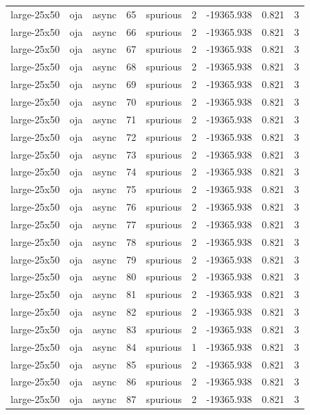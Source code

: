 \begin{tabular}{lllrlrrrr}
large-25x50 & oja & async & 65 & spurious & 2 & -19365.938 & 0.821 & 3 \\
large-25x50 & oja & async & 66 & spurious & 2 & -19365.938 & 0.821 & 3 \\
large-25x50 & oja & async & 67 & spurious & 2 & -19365.938 & 0.821 & 3 \\
large-25x50 & oja & async & 68 & spurious & 2 & -19365.938 & 0.821 & 3 \\
large-25x50 & oja & async & 69 & spurious & 2 & -19365.938 & 0.821 & 3 \\
large-25x50 & oja & async & 70 & spurious & 2 & -19365.938 & 0.821 & 3 \\
large-25x50 & oja & async & 71 & spurious & 2 & -19365.938 & 0.821 & 3 \\
large-25x50 & oja & async & 72 & spurious & 2 & -19365.938 & 0.821 & 3 \\
large-25x50 & oja & async & 73 & spurious & 2 & -19365.938 & 0.821 & 3 \\
large-25x50 & oja & async & 74 & spurious & 2 & -19365.938 & 0.821 & 3 \\
large-25x50 & oja & async & 75 & spurious & 2 & -19365.938 & 0.821 & 3 \\
large-25x50 & oja & async & 76 & spurious & 2 & -19365.938 & 0.821 & 3 \\
large-25x50 & oja & async & 77 & spurious & 2 & -19365.938 & 0.821 & 3 \\
large-25x50 & oja & async & 78 & spurious & 2 & -19365.938 & 0.821 & 3 \\
large-25x50 & oja & async & 79 & spurious & 2 & -19365.938 & 0.821 & 3 \\
large-25x50 & oja & async & 80 & spurious & 2 & -19365.938 & 0.821 & 3 \\
large-25x50 & oja & async & 81 & spurious & 2 & -19365.938 & 0.821 & 3 \\
large-25x50 & oja & async & 82 & spurious & 2 & -19365.938 & 0.821 & 3 \\
large-25x50 & oja & async & 83 & spurious & 2 & -19365.938 & 0.821 & 3 \\
large-25x50 & oja & async & 84 & spurious & 1 & -19365.938 & 0.821 & 3 \\
large-25x50 & oja & async & 85 & spurious & 2 & -19365.938 & 0.821 & 3 \\
large-25x50 & oja & async & 86 & spurious & 2 & -19365.938 & 0.821 & 3 \\
large-25x50 & oja & async & 87 & spurious & 2 & -19365.938 & 0.821 & 3 \\

\end{tabular}
